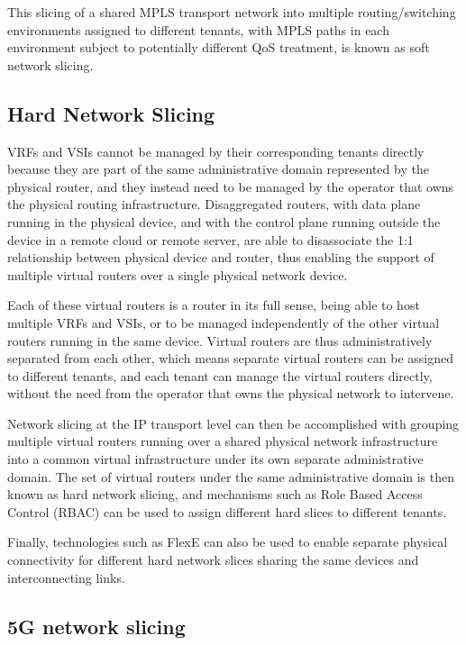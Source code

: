 \documentclass[journal,article,submit,moreauthors,pdftex]{Definitions/mdpi}
\begin{document}
This slicing of a shared MPLS transport network into multiple routing/switching environments assigned to different tenants, with MPLS paths in each environment subject to potentially different QoS treatment, is known as soft network slicing.

\subsection{Hard Network Slicing}

VRFs and VSIs cannot be managed by their corresponding tenants directly because they are part of the same administrative domain represented by the physical router, and they instead need to be managed by the operator that owns the physical routing infrastructure.  
Disaggregated routers, with data plane running in the physical device, and with the control plane running outside the device in a remote cloud or remote server, are able to disassociate the 1:1 relationship between physical device and router, thus enabling the support of multiple virtual routers over a single physical network device. 

Each of these virtual routers is a router in its full sense, being able to host multiple VRFs and VSIs, or to be managed independently of the other virtual routers running in the same device. Virtual routers are thus administratively separated from each other, which means separate virtual routers can be assigned to different tenants, and each tenant can manage the virtual routers directly, without the need from the operator that owns the physical network to intervene. 

Network slicing at the IP transport level can then be accomplished with grouping multiple virtual routers running over a shared physical network infrastructure into a common virtual infrastructure under its own separate administrative domain. The set of virtual routers under the same administrative domain is then known as hard network slicing, and mechanisms such as Role Based Access Control (RBAC) can be used to assign different hard slices to different tenants.

Finally, technologies such as FlexE can also be used to enable separate physical connectivity for different hard network slices sharing the same devices and interconnecting links.

\subsection{5G network slicing}
\end{document}
